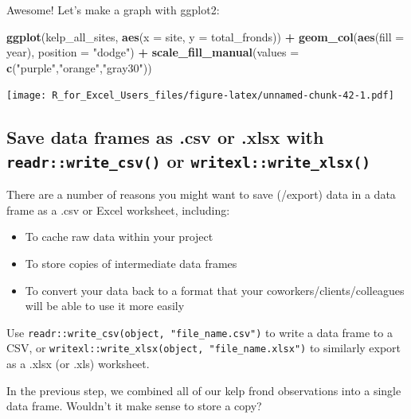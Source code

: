 \documentclass[]{book}
\newenvironment{Shaded}{\begin{snugshade}}{\end{snugshade}}
\newcommand{\DataTypeTok}[1]{\textcolor[rgb]{0.13,0.29,0.53}{#1}}
\newcommand{\KeywordTok}[1]{\textcolor[rgb]{0.13,0.29,0.53}{\textbf{#1}}}
\newcommand{\NormalTok}[1]{#1}
\newcommand{\OperatorTok}[1]{\textcolor[rgb]{0.81,0.36,0.00}{\textbf{#1}}}
\newcommand{\StringTok}[1]{\textcolor[rgb]{0.31,0.60,0.02}{#1}}
\providecommand{\tightlist}{%
  \setlength{\itemsep}{0pt}\setlength{\parskip}{0pt}}
\begin{document}
Awesome! Let's make a graph with ggplot2:

\begin{Shaded}
\begin{Highlighting}[]
\KeywordTok{ggplot}\NormalTok{(kelp_all_sites, }\KeywordTok{aes}\NormalTok{(}\DataTypeTok{x =}\NormalTok{ site, }\DataTypeTok{y =}\NormalTok{ total_fronds)) }\OperatorTok{+}
\StringTok{  }\KeywordTok{geom_col}\NormalTok{(}\KeywordTok{aes}\NormalTok{(}\DataTypeTok{fill =}\NormalTok{ year), }\DataTypeTok{position =} \StringTok{"dodge"}\NormalTok{) }\OperatorTok{+}
\StringTok{  }\KeywordTok{scale_fill_manual}\NormalTok{(}\DataTypeTok{values =} \KeywordTok{c}\NormalTok{(}\StringTok{"purple"}\NormalTok{,}\StringTok{"orange"}\NormalTok{,}\StringTok{"gray30"}\NormalTok{))}
\end{Highlighting}
\end{Shaded}

\texttt{[image: R\_for\_Excel\_Users\_files/figure-latex/unnamed-chunk-42-1.pdf]}

\hypertarget{save-data-frames-as-.csv-or-.xlsx-with-readrwrite_csv-or-writexlwrite_xlsx}{%
\subsection{\texorpdfstring{Save data frames as .csv or .xlsx with \texttt{readr::write\_csv()} or \texttt{writexl::write\_xlsx()}}{Save data frames as .csv or .xlsx with readr::write\_csv() or writexl::write\_xlsx()}}\label{save-data-frames-as-.csv-or-.xlsx-with-readrwrite_csv-or-writexlwrite_xlsx}}

There are a number of reasons you might want to save (/export) data in a data frame as a .csv or Excel worksheet, including:

\begin{itemize}
\tightlist
\item
  To cache raw data within your project
\item
  To store copies of intermediate data frames
\item
  To convert your data back to a format that your coworkers/clients/colleagues will be able to use it more easily
\end{itemize}

Use \texttt{readr::write\_csv(object,\ "file\_name.csv")} to write a data frame to a CSV, or \texttt{writexl::write\_xlsx(object,\ "file\_name.xlsx")} to similarly export as a .xlsx (or .xls) worksheet.

In the previous step, we combined all of our kelp frond observations into a single data frame. Wouldn't it make sense to store a copy?
\end{document}
